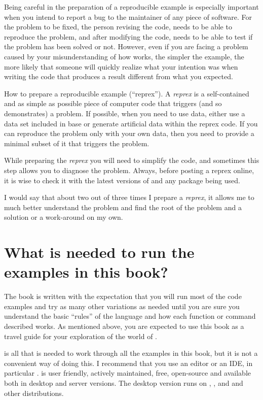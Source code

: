 \documentclass[krantz2]{krantz}\usepackage{knitr}
\begin{document}
Being careful in the preparation of a reproducible example is especially important when you intend to report a bug to the maintainer of any piece of software. For the problem to be fixed, the person revising the code, needs to be able to reproduce the problem, and after modifying the code, needs to be able to test if the problem has been solved or not. However, even if you are facing a problem caused by your misunderstanding of how \Rlang works, the simpler the example, the more likely that someone will quickly realize what your intention was when writing the code that produces a result different from what you expected.

\begin{explainbox}
How to prepare a reproducible example (``reprex''). A \emph{reprex} is a self-contained and as simple as possible piece of computer code that triggers (and so demonstrates) a problem. If possible, when you need to use data, either use a data set included in base \Rpgrm or generate artificial data within the reprex code. If you can reproduce the problem only with your own data, then you need to provide a minimal subset of it that triggers the problem.

While preparing the \emph{reprex} you will need to simplify the code, and sometimes this step allows you to diagnose the problem. Always, before posting a reprex online, it is wise to check it with the latest versions of \Rpgrm and any package being used.

I would say that about two out of three times I prepare a \emph{reprex}, it allows me to much better understand the problem and find the root of the problem and a solution or a work-around on my own.
\end{explainbox}

\section{What is needed to run the examples in this book?}

The book is written with the expectation that you will run most of the code examples and try as many other variations as needed until you are sure you understand the basic ``rules'' of the \Rpgrm language and how each function or command described works. As mentioned above, you are expected to use this book as a travel guide for your exploration of the world of \Rlang.

\Rpgrm is all that is needed to work through all the examples in this book, but it is not a convenient way of doing this. I recommend that you use an editor or an IDE, in particular \RStudio{}. \RStudio is user friendly, actively maintained, free, open-source and available both in desktop and server versions. The desktop version runs on , , and  and other  distributions.
\end{document}
